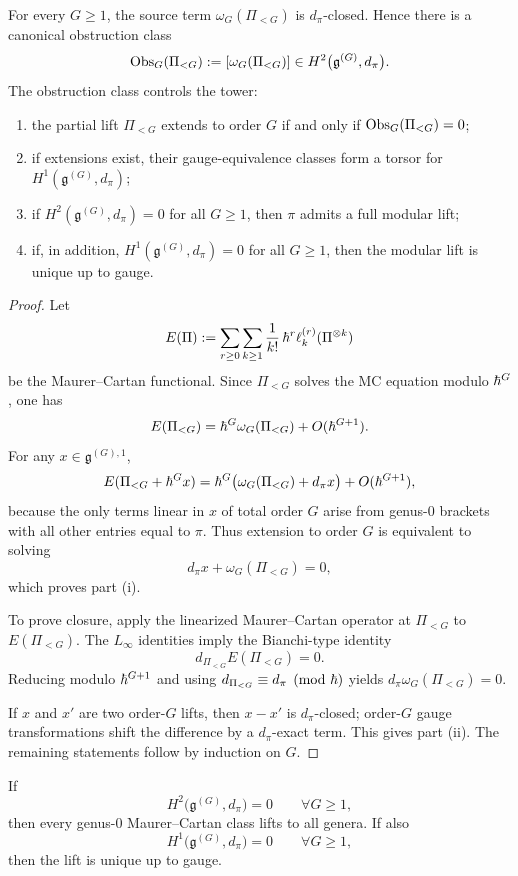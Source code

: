 \begin{theorem}
For every $G\ge 1$, the source term $\omega_G(\Pi_{<G})$ is $d_\pi$-closed. Hence there is a
canonical obstruction class
\[
\operatorname{Obs}_G(\Pi_{<G})
:=
[\omega_G(\Pi_{<G})]
\in H^2\bigl(\mathfrak g^{(G)},d_\pi\bigr).
\]
The obstruction class controls the tower:
\begin{enumerate}[label=\textup{(\roman*)}]
\item the partial lift $\Pi_{<G}$ extends to order $G$ if and only if
$\operatorname{Obs}_G(\Pi_{<G})=0$;
\item if extensions exist, their gauge-equivalence classes form a torsor for
$H^1(\mathfrak g^{(G)},d_\pi)$;
\item if $H^2(\mathfrak g^{(G)},d_\pi)=0$ for all $G\ge 1$, then $\pi$ admits a full modular
lift;
\item if, in addition, $H^1(\mathfrak g^{(G)},d_\pi)=0$ for all $G\ge 1$, then the modular lift
is unique up to gauge.
\end{enumerate}
\end{theorem}

\begin{proof}
Let
\[
E(\Pi):=\sum_{r\ge 0}\sum_{k\ge 1}\frac1{k!}\,\hbar^r\ell_k^{(r)}(\Pi^{\otimes k})
\]
be the Maurer--Cartan functional. Since $\Pi_{<G}$ solves the MC equation modulo $\hbar^G$, one
has
\[
E(\Pi_{<G})=\hbar^G\omega_G(\Pi_{<G})+O(\hbar^{G+1}).
\]
For any $x\in\mathfrak g^{(G),1}$,
\[
E(\Pi_{<G}+\hbar^Gx)=\hbar^G\bigl(\omega_G(\Pi_{<G})+d_\pi x\bigr)+O(\hbar^{G+1}),
\]
because the only terms linear in $x$ of total order $G$ arise from genus-$0$ brackets with all
other entries equal to $\pi$. Thus extension to order $G$ is equivalent to solving
\[
d_\pi x+\omega_G(\Pi_{<G})=0,
\]
which proves part \textup{(i)}.

To prove closure, apply the linearized Maurer--Cartan operator at $\Pi_{<G}$ to
$E(\Pi_{<G})$. The $L_\infty$ identities imply the Bianchi-type identity
\[
d_{\Pi_{<G}}E(\Pi_{<G})=0.
\]
Reducing modulo $\hbar^{G+1}$ and using $d_{\Pi_{<G}}\equiv d_\pi \pmod{\hbar}$ yields
$d_\pi\omega_G(\Pi_{<G})=0$.

If $x$ and $x'$ are two order-$G$ lifts, then $x-x'$ is $d_\pi$-closed; order-$G$ gauge
transformations shift the difference by a $d_\pi$-exact term. This gives part \textup{(ii)}.
The remaining statements follow by induction on $G$.
\end{proof}

\begin{corollary}
If
\[
H^2\bigl(\mathfrak g^{(G)},d_\pi\bigr)=0\qquad \forall G\ge 1,
\]
then every genus-$0$ Maurer--Cartan class lifts to all genera. If also
\[
H^1\bigl(\mathfrak g^{(G)},d_\pi\bigr)=0\qquad \forall G\ge 1,
\]
then the lift is unique up to gauge.
\end{corollary}

